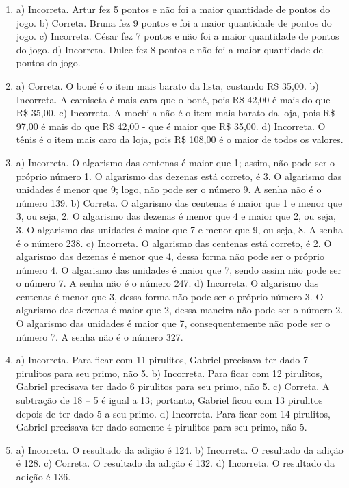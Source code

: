 \begin{enumerate}
\item
a) Incorreta. Artur fez 5 pontos e não foi a maior quantidade de pontos do jogo.
b) Correta. Bruna fez 9 pontos e foi a maior quantidade de pontos do jogo.
c) Incorreta. César fez 7 pontos e não foi a maior quantidade de pontos do jogo.
d) Incorreta. Dulce fez 8 pontos e não foi a maior quantidade de pontos do jogo.

\item
a) Correta. O boné é o item mais barato da lista, custando R\$ 35,00.
b) Incorreta. A camiseta é mais cara que o boné, pois R\$ 42,00 é mais do que R\$ 35,00.
c) Incorreta. A mochila não é o item mais barato da loja, pois R\$ 97,00 é mais do que R\$ 42,00 - que é maior que R\$ 35,00.
d) Incorreta. O tênis é o item mais caro da loja, pois R\$ 108,00 é o maior de todos os valores.

\item
a) Incorreta. O algarismo das centenas é maior que 1; assim, não
pode ser o próprio número 1. O algarismo das dezenas está correto, é 3.
O algarismo das unidades é menor que 9; logo, não pode ser o número 9. A senha não é o número 139.
b) Correta. O algarismo das centenas é maior que 1 e menor que 3, ou
seja, 2. O algarismo das dezenas é menor que 4 e maior que 2, ou seja,
3. O algarismo das unidades é maior que 7 e menor que 9, ou seja, 8. A
senha é o número 238.
c) Incorreta. O algarismo das centenas está correto, é 2. O algarismo
das dezenas é menor que 4, dessa forma não pode ser o próprio número 4.
O algarismo das unidades é maior que 7, sendo assim não pode ser o
número 7. A senha não é o número 247.
d) Incorreta. O algarismo das centenas é menor que 3, dessa forma não
pode ser o próprio número 3. O algarismo das dezenas é maior que 2,
dessa maneira não pode ser o número 2. O algarismo das unidades é maior
que 7, consequentemente não pode ser o número 7. A senha não é o número
327.

\item
a) Incorreta. Para ficar com 11 pirulitos, Gabriel precisava ter dado 7
pirulitos para seu primo, não 5.
b) Incorreta. Para ficar com 12 pirulitos, Gabriel precisava ter dado 6
pirulitos para seu primo, não 5.
c) Correta. A subtração de 18 -- 5 é igual a 13; portanto, Gabriel ficou
com 13 pirulitos depois de ter dado 5 a seu primo.
d) Incorreta. Para ficar com 14 pirulitos, Gabriel precisava ter dado
somente 4 pirulitos para seu primo, não 5.

\item
a) Incorreta. O resultado da adição é 124.
b) Incorreta. O resultado da adição é 128.
c) Correta. O resultado da adição é 132.
d) Incorreta. O resultado da adição é 136.


\end{enumerate}
